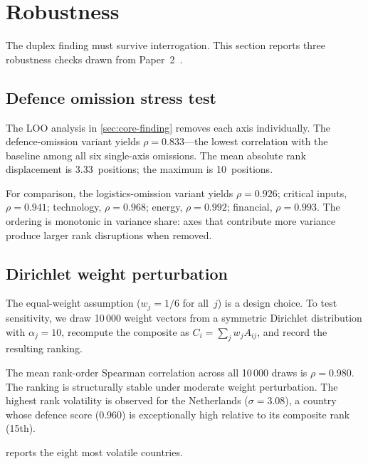 \section{Robustness}\label{sec:robustness}

The duplex finding must survive interrogation.  This section reports
three robustness checks drawn from Paper~2~\cite{isi_paper2}.

\subsection{Defence omission stress test}

The LOO analysis in \cref{sec:core-finding} removes each axis
individually.  The defence-omission variant yields
$\rho = 0.833$---the lowest correlation with the baseline among all
six single-axis omissions.  The mean absolute rank displacement is
3.33~positions; the maximum is 10~positions.

For comparison, the logistics-omission variant yields
$\rho = 0.926$; critical inputs, $\rho = 0.941$; technology,
$\rho = 0.968$; energy, $\rho = 0.992$; financial, $\rho = 0.993$.
The ordering is monotonic in variance share: axes that contribute
more variance produce larger rank disruptions when removed.

\subsection{Dirichlet weight perturbation}

The equal-weight assumption ($w_j = 1/6$ for all~$j$) is a design
choice.  To test sensitivity, we draw 10\,000 weight vectors from
a symmetric Dirichlet distribution with $\alpha_j = 10$, recompute
the composite as $C_i = \sum_j w_j A_{ij}$, and record the
resulting ranking.

The mean rank-order Spearman correlation across all 10\,000 draws
is $\rho = 0.980$.  The ranking is structurally stable under
moderate weight perturbation.  The highest rank volatility is
observed for the Netherlands ($\sigma = 3.08$), a country whose
defence score (0.960) is exceptionally high relative to its
composite rank (15th).

 reports the eight most volatile countries.



